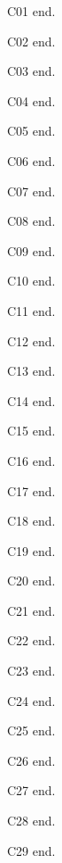 C01 \cite{d01} end.

C02 \cite{d02} end.

C03 \cite{d03} end.

C04 \cite{d04} end.

C05 \cite{d05} end.

C06 \cite{d06} end.

C07 \cite{d07} end.

C08 \cite{d08} end.

C09 \cite{d09} end.

C10 \cite{d10} end.

C11 \cite{d11} end.

C12 \cite{d12} end.

C13 \cite{d13} end.

C14 \cite{d14} end.

C15 \cite{d15} end.

C16 \cite{d16} end.

C17 \cite{d17} end.

C18 \cite{d20} end.

C19 \cite{d21} end.

C20 \cite{d22} end.

C21 \cite{d24} end.

C22 \cite{d25} end.

C23 \cite{d26} end.

C24 \cite{d27} end.

C25 \cite{d28} end.

C26 \cite{d29} end.

C27 \cite{d30} end.

C28 \cite{d31} end.

C29 \cite{d32} end.

